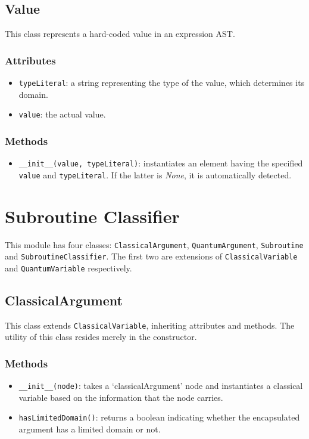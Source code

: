 \documentclass[12pt,a4paper]{report}
\theoremstyle{definition}
\theoremstyle{definition}
\theoremstyle{definition}
\begin{document}
\subsection{Value}
This class represents a hard-coded value in an expression AST.
\subsubsection{Attributes}
\begin{itemize}
    \itemsep 0em
    \item \texttt{typeLiteral}: a string representing the type of the value, which determines its domain.
    \item \texttt{value}: the actual value.
\end{itemize}
\subsubsection{Methods}
\begin{itemize}
    \itemsep 0em
    \item \texttt{\_\_init\_\_(value, typeLiteral)}: instantiates an element having the specified \texttt{value} and \texttt{typeLiteral}. If the latter is \textit{None}, it is automatically detected.
\end{itemize}



\section{Subroutine Classifier}
This module has four classes: \texttt{ClassicalArgument}, \texttt{QuantumArgument}, \texttt{Subroutine} and \texttt{SubroutineClassifier}. The first two are extensions of \texttt{ClassicalVariable} and \texttt{QuantumVariable} respectively.
\subsection{ClassicalArgument}
This class extends \texttt{ClassicalVariable}, inheriting attributes and methods.
The utility of this class resides merely in the constructor.
\subsubsection{Methods}
\begin{itemize}
    \itemsep 0em
    \item \texttt{\_\_init\_\_(node)}: takes a `classicalArgument' node and instantiates a classical variable based on the information that the node carries.
    \item \texttt{hasLimitedDomain()}: returns a boolean indicating whether the encapsulated argument has a limited domain or not.
\end{itemize}
\end{document}
